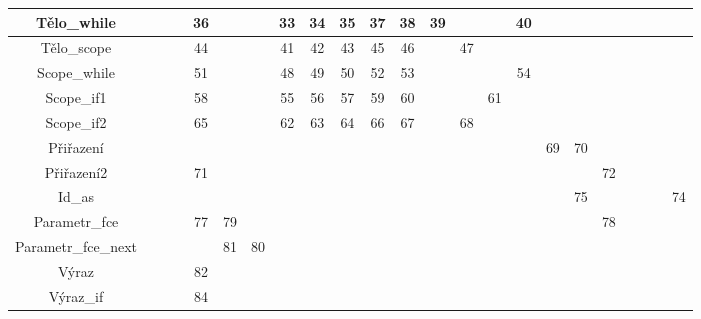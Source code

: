 \documentclass[11pt, a4paper]{article}
\begin{document}
\begin{table}[H]
{{\begin{tabular}{|c|c|c|c|c|c|c|c|c|c|c|c|c|c|c|c|c|c|c|c|c|c|c|}
				Tělo\_while         &         &          &       & 36 &    &    & 33  & 34 & 35 & 37    & 38    & 39     &     &      & 40   &    &     &         &         &        &        &    \\ \hline
				Tělo\_scope         &         &          &       & 44 &    &    & 41  & 42 & 43 & 45    & 46    &        & 47  &      &      &    &     &         &         &        &        &    \\ \hline
				Scope\_while        &         &          &       & 51 &    &    & 48  & 49 & 50 & 52    & 53    &        &     &      & 54   &    &     &         &         &        &        &    \\ \hline
				Scope\_if1          &         &          &       & 58 &    &    & 55  & 56 & 57 & 59    & 60    &        &     & 61   &      &    &     &         &         &        &        &    \\ \hline
				Scope\_if2          &         &          &       & 65 &    &    & 62  & 63 & 64 & 66    & 67    &        & 68  &      &      &    &     &         &         &        &        &    \\ \hline
				Přiřazení           &         &          &       &    &    &    &     &    &    &       &       &        &     &      &      & 69 & 70  &         &         &        &        &    \\ \hline
				Přiřazení2          &         &          &       & 71 &    &    &     &    &    &       &       &        &     &      &      &    &     & 72      &         &        &        &    \\ \hline
				Id\_as              &         &          &       &    &    &    &     &    &    &       &       &        &     &      &      &    & 75  &         &         &        &        & 74 \\ \hline
				Parametr\_fce       &         &          &       & 77 & 79 &    &     &    &    &       &       &        &     &      &      &    &     & 78      &         &        &        &    \\ \hline
				Parametr\_fce\_next &         &          &       &    & 81 & 80 &     &    &    &       &       &        &     &      &      &    &     &         &         &        &        &    \\ \hline
				Výraz               &         &          &       & 82 &    &    &     &    &    &       &       &        &     &      &      &    &     &         &         &        &        &    \\ \hline
				Výraz\_if           &         &          &       & 84 &    &    &     &    &    &       &       &        &     &      &      &    &     &         &         &        &        &    \\ \hline

\end{tabular}}}
\end{table}
\end{document}
